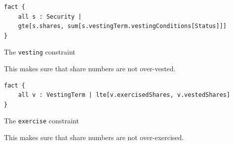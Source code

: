 \begin{listing}[!h]
\begin{verbatim}  
fact {
    all s : Security |
    gte[s.shares, sum[s.vestingTerm.vestingConditions[Status]]]
}
\end{verbatim}
\caption{The \texttt{vesting} constraint}
\label{lst:vesting-constraint-2}
\end{listing}


This makes sure that share numbers are not over-vested.

\begin{listing}[!h]
\begin{verbatim}
fact { 
    all v : VestingTerm | lte[v.exercisedShares, v.vestedShares] 
}
\end{verbatim}
\caption{The \texttt{exercise} constraint}
\label{lst:exercise-constraint-2}
\end{listing}


This makes sure that share numbers are not over-exercised.

